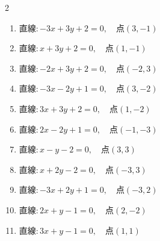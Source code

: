 \begin{multicols}{2}
\begin{enumerate}

  \item $直線:-3x+3y+2=0,\quad 点 ( 3, -1 )$


  \item $直線:x+3y+2=0,\quad 点 ( 1, -1 )$

        \phantom{$\displaystyle 距離 : 0$}

  \item $直線:-2x+3y+2=0,\quad 点 ( -2, 3 )$


  \item $直線:-3x-2y+1=0,\quad 点 ( 3, -2 )$


  \item $直線:3x+3y+2=0,\quad 点 ( 1, -2 )$


\columnbreak %

\resetques

  \item $直線:2x-2y+1=0,\quad 点 ( -1, -3 )$


  \item $直線:x-y-2=0,\quad 点 ( 3, 3 )$


  \item $直線:x+2y-2=0,\quad 点 ( -3, 3 )$


  \item $直線:-3x+2y+1=0,\quad 点 ( -3, 2 )$


  \item $直線:2x+y-1=0,\quad 点 ( 2, -2 )$


  \item $直線:3x+y-1=0,\quad 点 ( 1, 1 )$



\end{enumerate}
\end{multicols}
